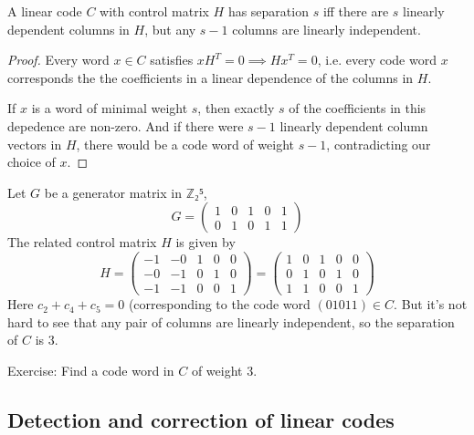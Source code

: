 \documentclass[english]{lbscript}
\begin{document}
\begin{theorem}{}{}
	A linear code \(C\) with control matrix \(H\) has separation \(s\) iff there are \(s\) linearly dependent columns in \(H\), but any \(s-1\) columns are linearly independent.
\end{theorem}
\begin{proof}
	Every word \(x∈C\) satisfies \(xH^{T}=0⟹Hx^{T}=0\), i.e. every code word \(x\) corresponds the the coefficients in a linear dependence of the columns in \(H\).

	If \(x\) is a word of minimal weight \(s\), then exactly \(s\) of the coefficients in this depedence are non-zero. And if there were \(s-1\) linearly dependent column vectors in \(H\), there would be a code word of weight \(s-1\), contradicting our choice of \(x\).
\end{proof}
\begin{example}{}{}
	Let \(G\) be a generator matrix in \(ℤ₂⁵\),
	\begin{equation}
		\label{eq:146}
		G = \begin{pmatrix}
			1 & 0 & 1 & 0 & 1 \\
			0 & 1 & 0 & 1 & 1
		\end{pmatrix}
	\end{equation}
	The related control matrix \(H\) is given by
	\begin{equation}
		\label{eq:147}
		H = \begin{pmatrix}
			-1 & -0 & 1 & 0 & 0 \\
			-0 & -1 & 0 & 1 & 0 \\
			-1 & -1 & 0 & 0 & 1
		\end{pmatrix}
		= \begin{pmatrix}
			1 & 0 & 1 & 0 & 0 \\
			0 & 1 & 0 & 1 & 0 \\
			1 & 1 & 0 & 0 & 1
		\end{pmatrix}
	\end{equation}
	Here \(c_2+c_4+c_5=0\) (corresponding to the code word \((01011)∈C\). But it's not hard to see that any pair of columns are linearly independent, so the separation of \(C\) is \(3\).
\end{example}
\begin{example}{}{}
	Exercise: Find a code word in \(C\) of weight 3.
\end{example}

\subsection{Detection and correction of linear codes}
\label{sec:detect-corr-line}
\end{document}
